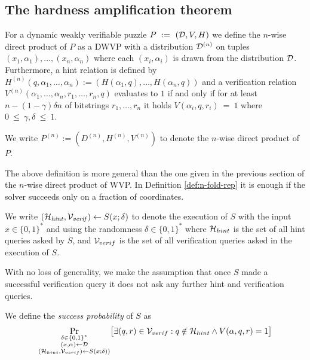 \subsection{The hardness amplification theorem}
\begin{definition}
  \label{def:n-wdp-dwvp}
For a dynamic weakly verifiable puzzle $P~:=~(\mathcal{D}, V, H)$ we define the $n$-wise direct product of $P$
as a DWVP with a distribution $\mathcal{D}^{(n)}$ on tuples $(x_1, \alpha_1), \dotsc, (x_n, \alpha_n)$ where
each $(x_i, \alpha_i)$ is drawn from the distribution $\mathcal{D}$.
Furthermore, a hint relation is defined by $H^{(n)}(q, \alpha_1, \dotsc, \alpha_n) := (H(\alpha_1, q), \dotsc, H(\alpha_n, q))$ and
a verification relation $V^{(n)}(\alpha_1, \dotsc, \alpha_n, r_1, \dotsc, r_n, q)$ evaluates to $1$ if and only if
for at least $n - (1 - \gamma)\delta n$ of bitstrings $r_1, \dotsc, r_n $ it holds $V(\alpha_i, q, r_i)~=~1$ where $0~\leq~\gamma,\delta~\leq~1$.
%
\end{definition}
We write $P^{(n)} := (D^{(n)}, H^{(n)}, V^{(n)})$ to denote the $n$-wise direct product of $P$.

The above definition is more general than the one given in the previous section of the $n$-wise direct product of WVP.
In Definition \ref{def:n-fold-rep} it is enough if the solver succeeds only on a fraction of coordinates.

We write $(\mathcal{H}_{\mathit{hint}}, \mathcal{V}_{\mathit{verif}}) \leftarrow S(x; \delta)$ to denote
the execution of $S$ with the input $x \in \{0,1\}^{*}$ and using the randomness $\delta \in \{0,1\}^{*}$
where $\mathcal{H}_{hint}$ is the set of all hint queries asked by $S$, and $\mathcal{V}_{verif}$ is
the set of all verification queries asked in the execution of $S$.

With no loss of generality, we make the assumption that once $S$
made a successful verification query it does not ask any further hint and verification queries.

We define the \textit{success probability} of $S$ as
\begin{align*}
  \underset{\substack{\delta \in \{0,1\}^{*} \\(x,\alpha) \leftarrow \mathcal{D} \\ (\mathcal{H}_{hint}, \mathcal{V}_{verif}) \leftarrow S(x;\delta))}}
  {\Pr}\big[\exists (q,r) \in \mathcal{V}_{verif} : q \notin \mathcal{H}_{hint} \land V(\alpha, q, r) = 1 \big]
\end{align*}

